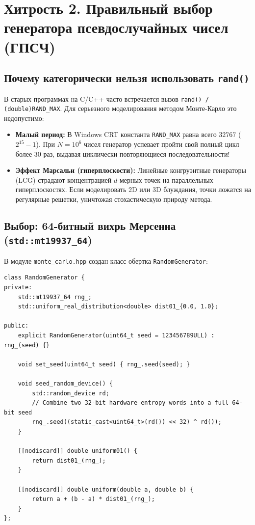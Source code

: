\documentclass[11pt,a4paper]{article}
\begin{document}
\newpage

\section{Хитрость 2. Правильный выбор генератора псевдослучайных чисел (ГПСЧ)}

\subsection{Почему категорически нельзя использовать \texttt{rand()}}
В старых программах на C/C++ часто встречается вызов \texttt{rand() / (double)RAND\_MAX}. Для серьезного моделирования методом Монте-Карло это недопустимо:
\begin{itemize}
    \item \textbf{Малый период:} В Windows CRT константа \texttt{RAND\_MAX} равна всего $32767$ ($2^{15}-1$). При $N = 10^6$ чисел генератор успевает пройти свой полный цикл более 30 раз, выдавая циклически повторяющиеся последовательности!
    \item \textbf{Эффект Марсальи (гиперплоскости):} Линейные конгруэнтные генераторы (LCG) страдают концентрацией $d$-мерных точек на параллельных гиперплоскостях. Если моделировать 2D или 3D блуждания, точки ложатся на регулярные решетки, уничтожая стохастическую природу метода.
\end{itemize}

\subsection{Выбор: 64-битный вихрь Мерсенна (\texttt{std::mt19937\_64})}
В модуле \texttt{monte\_carlo.hpp} создан класс-обертка \texttt{RandomGenerator}:

\begin{lstlisting}
class RandomGenerator {
private:
    std::mt19937_64 rng_;
    std::uniform_real_distribution<double> dist01_{0.0, 1.0};

public:
    explicit RandomGenerator(uint64_t seed = 123456789ULL) : rng_(seed) {}

    void set_seed(uint64_t seed) { rng_.seed(seed); }

    void seed_random_device() {
        std::random_device rd;
        // Combine two 32-bit hardware entropy words into a full 64-bit seed
        rng_.seed((static_cast<uint64_t>(rd()) << 32) ^ rd());
    }

    [[nodiscard]] double uniform01() { 
        return dist01_(rng_); 
    }

    [[nodiscard]] double uniform(double a, double b) { 
        return a + (b - a) * dist01_(rng_); 
    }
};
\end{lstlisting}
\end{document}

